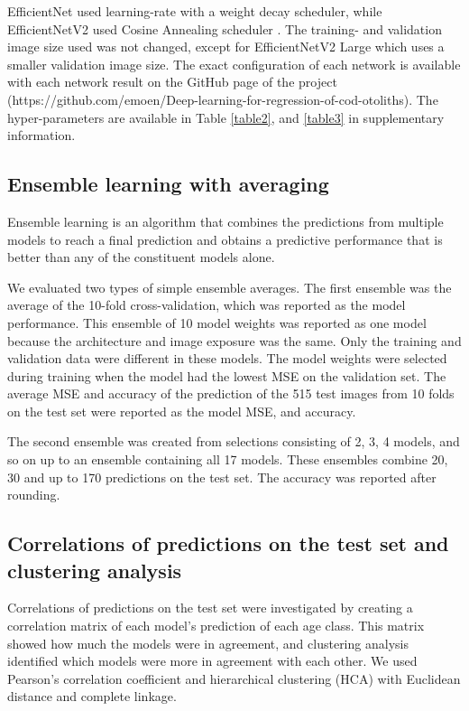 \documentclass[10pt,letterpaper]{article}
\begin{document}
EfficientNet used learning-rate with a weight decay scheduler, while EfficientNetV2 
used Cosine Annealing scheduler \citep{Loshchilovetal}. The training- and validation 
image size used was not changed, except for EfficientNetV2 Large which uses a smaller validation image size. The exact configuration of each network is available with each network result on the GitHub page of the project (https://github.com/emoen/Deep-learning-for-regression-of-cod-otoliths). The hyper-parameters are available in Table \ref{table2}, and \ref{table3} in supplementary information.

\subsection{Ensemble learning with averaging}

Ensemble learning is an algorithm that combines the predictions from multiple models to reach a final prediction and obtains a predictive performance that is better than any of the constituent models alone.

We evaluated two types of simple ensemble averages. The first ensemble was the average of the 10-fold cross-validation, which was reported as the model performance. This ensemble of 10 model weights was reported as one model because the architecture and image exposure was the same. Only the training and validation data were different in these models. The model weights were selected during training when the model had the lowest MSE on the validation set. The average MSE and accuracy of the prediction of the 515 test images from 10 folds on the test set were reported as the model MSE, and accuracy.

The second ensemble was created from selections consisting of 2, 3, 4 models, and so on up to an ensemble containing all 17 models. These ensembles combine 20, 30 and up to 170 predictions on the test set. The accuracy was reported after rounding. 

\subsection{Correlations of predictions on the test set and clustering analysis}

Correlations of predictions on the test set were investigated by creating a correlation matrix of each model's prediction of each age class. This matrix showed how much the models were in agreement, and clustering analysis identified which models were more in agreement with each other.  We used Pearson's correlation coefficient and hierarchical clustering (HCA) with Euclidean distance and complete linkage. 
\end{document}
